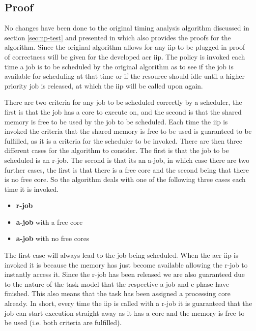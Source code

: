 \documentclass{kththesis}
\begin{document}
\subsection{Proof}

No changes have been done to the original timing analysis algorithm discussed in section
\ref{sec:np-test} and presented in \parencite{nasri_exact_2017} which also provides the proofs for
the algorithm. Since the original algorithm allows for any \acrshort{iip} to be plugged in proof of
correctness will be given for the developed \acrshort{aer} \acrshort{iip}. The policy is invoked
each time a job is to be scheduled by the original algorithm as to see if the job is available for
scheduling at that time or if the resource should idle until a higher priority job is released,
at which the \acrshort{iip} will be called upon again.

%
%



There are two criteria for any job to be scheduled correctly by a scheduler, the first is that the
job has a core to execute on, and the second is that the shared memory is free to be used by the job
to be scheduled. Each time the \acrshort{iip} is invoked the criteria that the shared memory is free
to be used is guaranteed to be fulfilled, as it is a criteria for the scheduler to be invoked. There
are then three different cases for the algorithm to consider. The first is that the job to be
scheduled is an \acrshort{r}-job. The second is that its an \acrshort{a}-job, in which case there
are two further cases, the first is that there is a free core and the second being that there is no
free core. So the algorithm deals with one of the following three cases each time it is invoked.

\begin {itemize}
    \item \textbf{\acrshort{r}-job}
    \item \textbf{\acrshort{a}-job} with a free core
    \item \textbf{\acrshort{a}-job} with no free cores
\end {itemize}

The first case will always lead to the job being scheduled. When the \acrshort{aer} \acrshort{iip}
is invoked it is because the memory has just become available allowing the \acrshort{r}-job to
instantly access it. Since the \acrshort{r}-job has been released we are also guaranteed due to the
nature of the task-model that the respective \acrshort{a}-job and \acrshort{e}-phase have finished.
This also means that the task has been assigned a processing core already. In short, every time the
\acrshort{iip} is called with a \acrshort{r}-job it is guaranteed that the job
can start execution straight away as it has a core and the memory is free to be used (i.e. both
criteria are fulfilled). 
\end{document}
